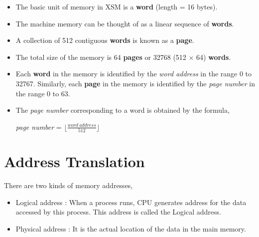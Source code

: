 \documentclass[11pt]{report}
\begin{document}
\begin{itemize}
\item The basic unit of memory in XSM is a \textbf{word} (length = 16 bytes).
\item The machine memory can be thought of as a linear sequence of \textbf{words}.
\item A collection of 512 contiguous \textbf{words} is known as a \textbf{page}.
\item The total size of the memory is 64 \textbf{pages} or 32768 (512 $\times$ 64) \textbf{words}.
\item Each \textbf{word} in the memory is identified by the \textit{word address} in the range 0 to 32767. Similarly, each \textbf{page} in the memory is identified by the \textit{page number} in the range 0 to 63.
\item The \textit{page number} corresponding to a word is obtained by the formula,
\begin{center}
 \textit{ page number }= $\lfloor \frac{word\ address}{512} \rfloor$
\end{center}
\end{itemize}



\section{Address Translation}

There are two kinds of memory addresses,

\begin{itemize}
\item Logical address : When a process runs, CPU generates address for the data accessed by this process. This address is called the Logical address.

\item Physical address : It is the actual location of the data in the main memory.
\end{itemize}
\end{document}
